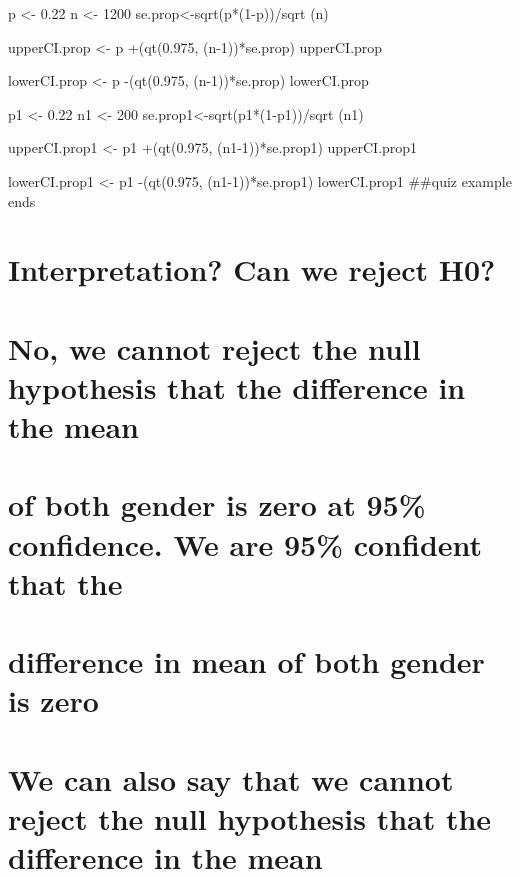 \documentclass[
]{article}
\begin{document}
p \textless- 0.22 n \textless- 1200 se.prop\textless-sqrt(p*(1-p))/sqrt
(n)

upperCI.prop \textless- p +(qt(0.975, (n-1))*se.prop) upperCI.prop

lowerCI.prop \textless- p -(qt(0.975, (n-1))*se.prop) lowerCI.prop

p1 \textless- 0.22 n1 \textless- 200
se.prop1\textless-sqrt(p1*(1-p1))/sqrt (n1)

upperCI.prop1 \textless- p1 +(qt(0.975, (n1-1))*se.prop1) upperCI.prop1

lowerCI.prop1 \textless- p1 -(qt(0.975, (n1-1))*se.prop1) lowerCI.prop1
\#\#quiz example ends

\hypertarget{interpretation-can-we-reject-h0}{%
\section{Interpretation? Can we reject
H0?}\label{interpretation-can-we-reject-h0}}

\hypertarget{no-we-cannot-reject-the-null-hypothesis-that-the-difference-in-the-mean}{%
\section{No, we cannot reject the null hypothesis that the difference in
the
mean}\label{no-we-cannot-reject-the-null-hypothesis-that-the-difference-in-the-mean}}

\hypertarget{of-both-gender-is-zero-at-95-confidence.-we-are-95-confident-that-the}{%
\section{of both gender is zero at 95\% confidence. We are 95\%
confident that
the}\label{of-both-gender-is-zero-at-95-confidence.-we-are-95-confident-that-the}}

\hypertarget{difference-in-mean-of-both-gender-is-zero}{%
\section{difference in mean of both gender is
zero}\label{difference-in-mean-of-both-gender-is-zero}}

\hypertarget{we-can-also-say-that-we-cannot-reject-the-null-hypothesis-that-the-difference-in-the-mean}{%
\section{We can also say that we cannot reject the null hypothesis that
the difference in the
mean}\label{we-can-also-say-that-we-cannot-reject-the-null-hypothesis-that-the-difference-in-the-mean}}
\end{document}
